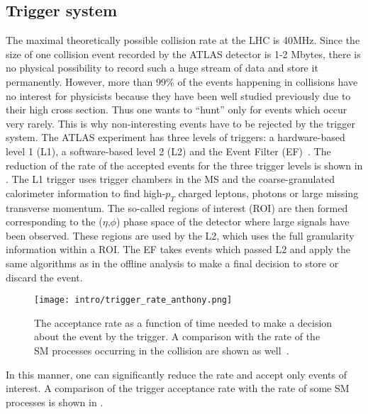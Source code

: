 \subsection{Trigger system}
The maximal theoretically possible collision rate at the LHC is 40MHz.
Since the size of one \pp collision event recorded by the ATLAS detector is 1-2 Mbytes, there is no physical possibility to record such a huge stream of data and store it permanently. However, more than 99$\%$ of the events happening in \pp collisions have no interest for physicists because they have been well studied previously due to their high cross section. Thus one wants to ``hunt'' only for events which occur very rarely. This is why non-interesting events have to be rejected by the trigger system.
The ATLAS experiment has three levels of triggers: a hardware-based level 1 (L1), a software-based level 2 (L2) and the Event Filter (EF)~\cite{tdr_tdaq}.
The reduction of the rate of the accepted events for the three trigger levels is shown in .
The L1 trigger uses trigger chambers in the MS and the coarse-granulated calorimeter information to find high-$p_T$ charged leptons, photons or large missing transverse momentum. The so-called regions of interest (ROI) are then formed corresponding to the ($\eta$,$\phi$) phase space of the detector where large signals have been observed. These regions are used by the L2, which uses the full granularity information within a ROI. The EF takes events which passed L2 and apply the same algorithms as in the offline analysis to make a final decision to store or discard the event.

\begin{figure}[h!]
\centering
 \texttt{[image: intro/trigger\_rate\_anthony.png]}
 \caption{The acceptance rate as a function of time needed to make a decision about the event by the trigger. A comparison with the rate of the SM processes occurring in the \pp collision are shown as well~\cite{anthony_thesis}.}
\label{fig:trigger_rate}
\end{figure}

In this manner, one can significantly reduce the rate and accept only events of interest. A comparison of the  trigger acceptance rate with the rate of some SM processes is shown in .


